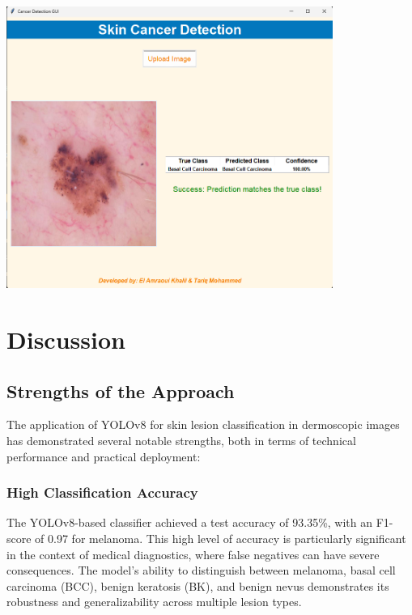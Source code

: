 \documentclass[a4paper,12pt]{report}
\begin{document}
\begin{spacing}{1.5}
    \begin{center}
        \includegraphics[width=0.8\textwidth]{Pics/result2.png}
    \end{center}

\chapter{Discussion}

    \section{Strengths of the Approach}
    
    The application of YOLOv8 for skin lesion classification in dermoscopic images has demonstrated several notable strengths, both in terms of technical performance and practical deployment:
    
        \subsection*{High Classification Accuracy}
        The YOLOv8-based classifier achieved a test accuracy of 93.35\%, with an F1-score of 0.97 for melanoma. This high level of accuracy is particularly significant in the context of medical diagnostics, where false negatives can have severe consequences. The model’s ability to distinguish between melanoma, basal cell carcinoma (BCC), benign keratosis (BK), and benign nevus demonstrates its robustness and generalizability across multiple lesion types.
        

\end{spacing}
\end{document}
